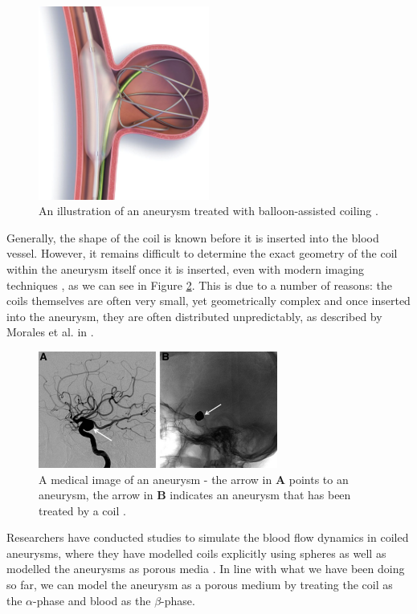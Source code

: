 \documentclass[a4paper, 11pt]{report}
\begin{document}
\begin{figure}[!htb]
    \centering
    \includegraphics[width=0.5\textwidth, angle=90, origin=c]{figures/aneurysm/ballooncoil.jpg}
    \caption[An illustration of an aneurysm treated with balloon-assisted coiling]{An illustration of an aneurysm treated with balloon-assisted coiling \cite[Figure 2]{imaging}.}
    \label{fig:ballooncoil}
\end{figure}

Generally, the shape of the coil is known before it is inserted into the blood vessel. However, it remains difficult to determine the exact geometry of the coil within the aneurysm itself once it is inserted, even with modern imaging techniques \cite{imaging}, as we can see in Figure \ref{fig:coilinaneurysm}. This is due to a number of reasons: the coils themselves are often very small, yet geometrically complex and once inserted into the aneurysm, they are often distributed unpredictably, as described by Morales et al. in \cite{Morales2011}. 

\begin{figure}[!htb]
    \centering
    \includegraphics[width=0.7\textwidth]{figures/aneurysm/aneurysmcoil.jpg}
    \caption[A medical image of an aneurysm]{A medical image of an aneurysm - the arrow in \textbf{A} points to an aneurysm, the arrow in \textbf{B} indicates an aneurysm that has been treated by a coil \cite[Figure 1]{imaging}.}
    \label{fig:coilinaneurysm}
\end{figure}
\newpage
Researchers have conducted studies to simulate the blood flow dynamics in coiled aneurysms, where they have modelled coils explicitly using spheres \cite{BYUN2004} as well as modelled the aneurysms as porous media \cite{kakalis2008}. In line with what we have been doing so far, we can model the aneurysm as a porous medium by treating the coil as the $\alpha$-phase and blood as the $\beta$-phase.
\end{document}
